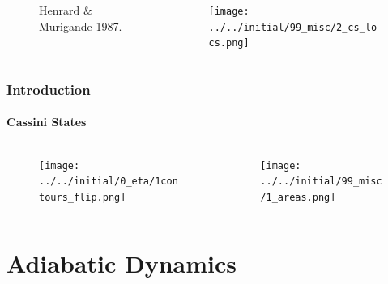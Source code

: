 \documentclass[dvipsnames]{beamer}
\begin{document}
\begin{frame}
\begin{columns}
\begin{column}{0.5\textwidth}
\begin{figure}
\begin{subfigure}{0.3\textwidth}
                \end{subfigure}
                \caption{Henrard \& Murigande 1987.}
            \end{figure}
        \end{column}
        \begin{column}{0.5\textwidth}
            \begin{figure}
                \centering
                \texttt{[image: ../../initial/99\_misc/2\_cs\_locs.png]}
            \end{figure}
        \end{column}
    \end{columns}
\end{frame}

\begin{frame}
    \frametitle{Introduction}
    \framesubtitle{Cassini States}

    \begin{columns}
        \begin{column}{0.5\textwidth}
            \begin{figure}
                \centering
                \texttt{[image: ../../initial/0\_eta/1contours\_flip.png]}
            \end{figure}
        \end{column}
        \begin{column}{0.5\textwidth}
            \begin{figure}
                \centering
                \texttt{[image: ../../initial/99\_misc/1\_areas.png]}
            \end{figure}
        \end{column}
    \end{columns}
\end{frame}

\section{Adiabatic Dynamics}
\end{document}
